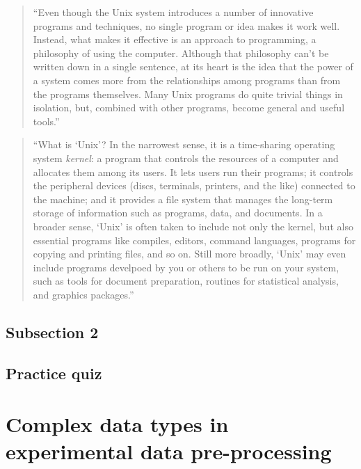 \documentclass[]{tufte-book}
\begin{document}
\begin{quote}
``Even though the Unix system introduces a number of innovative programs and techniques,
no single program or idea makes it work well. Instead, what makes it effective is an approach
to programming, a philosophy of using the computer. Although that philosophy can't be written
down in a single sentence, at its heart is the idea that the power of a system comes more from
the relationships among programs than from the programs themselves. Many Unix programs do
quite trivial things in isolation, but, combined with other programs, become general and
useful tools.'' \citep{kernighan1984unix}
\end{quote}

\begin{quote}
``What is `Unix'? In the narrowest sense, it is a time-sharing operating system \emph{kernel}:
a program that controls the resources of a computer and allocates them among its users.
It lets users run their programs; it controls the peripheral devices (discs, terminals,
printers, and the like) connected to the machine; and it provides a file system that
manages the long-term storage of information such as programs, data, and documents.
In a broader sense, `Unix' is often taken to include not only the kernel, but also
essential programs like compiles, editors, command languages, programs for copying and
printing files, and so on. Still more broadly, `Unix' may even include programs
develpoed by you or others to be run on your system, such as tools for document
preparation, routines for statistical analysis, and graphics packages.'' \citep{kernighan1984unix}
\end{quote}

\hypertarget{subsection-2}{%
\subsection{Subsection 2}\label{subsection-2}}

\hypertarget{practice-quiz}{%
\subsection{Practice quiz}\label{practice-quiz}}

\hypertarget{complex-data-types-in-experimental-data-pre-processing}{%
\section{Complex data types in experimental data pre-processing}\label{complex-data-types-in-experimental-data-pre-processing}}
\end{document}
